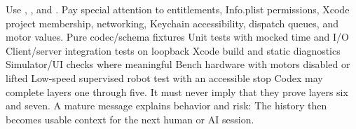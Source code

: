 {}\markdownRendererInterblockSeparator
{}
\markdownRendererSectionEnd \markdownRendererSectionBegin
{}\markdownRendererInterblockSeparator
{}Use , , and . Pay special attention\markdownRendererSoftLineBreak
{}to entitlements, Info.plist permissions, Xcode project membership, networking,\markdownRendererSoftLineBreak
{}Keychain accessibility, dispatch queues, and motor values.\markdownRendererInterblockSeparator
{}
\markdownRendererSectionEnd \markdownRendererSectionBegin
{}\markdownRendererInterblockSeparator
{}\markdownRendererOlBegin
{}Pure codec/schema fixtures\markdownRendererOlItemEnd 
{}Unit tests with mocked time and I/O\markdownRendererOlItemEnd 
{}Client/server integration tests on loopback\markdownRendererOlItemEnd 
{}Xcode build and static diagnostics\markdownRendererOlItemEnd 
{}Simulator/UI checks where meaningful\markdownRendererOlItemEnd 
{}Bench hardware with motors disabled or lifted\markdownRendererOlItemEnd 
{}Low-speed supervised robot test with an accessible stop\markdownRendererOlItemEnd 
\markdownRendererOlEnd \markdownRendererInterblockSeparator
{}Codex may complete layers one through five. It must never imply that they prove\markdownRendererSoftLineBreak
{}layers six and seven.\markdownRendererInterblockSeparator
{}
\markdownRendererSectionEnd \markdownRendererSectionBegin
{}\markdownRendererInterblockSeparator
{}A mature message explains behavior and risk:\markdownRendererInterblockSeparator
{}\markdownRendererInterblockSeparator
{}The history then becomes usable context for the next human or AI session.\markdownRendererInterblockSeparator
{}\markdownRendererThematicBreak{}\markdownRendererInterblockSeparator
{}
\markdownRendererSectionEnd 
\markdownRendererSectionEnd \markdownRendererSectionBegin
